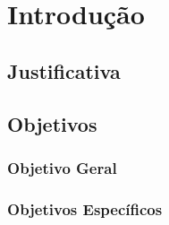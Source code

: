 \chapter{Introdução}
\label{cap:introducao}



\section{Justificativa}
\label{sec:justificativa}



\section{Objetivos}
\label{sec:objetivos}


\subsection{Objetivo Geral}
\label{sec:objetivo-geral}


\subsection{Objetivos Específicos}
\label{sec:objetivos-especificos}

%

